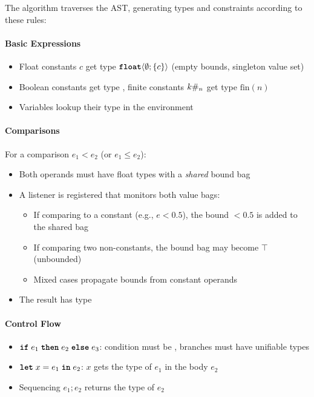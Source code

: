 The algorithm traverses the AST, generating types and constraints according to these rules:

\paragraph{Basic Expressions}
\begin{itemize}
    \item Float constants $c$ get type $\text{\ttfamily\bfseries float}\langle \emptyset; \{c\} \rangle$ (empty bounds, singleton value set)
    \item Boolean constants get type \bool{}, finite constants $k\#_{n}$ get type $\text{fin}(n)$
    \item Variables lookup their type in the environment
\end{itemize}

\paragraph{Comparisons} For a comparison $e_1 < e_2$ (or $e_1 \leq e_2$):
\begin{itemize}
    \item Both operands must have float types with a \emph{shared} bound bag
    \item A listener is registered that monitors both value bags:
    \begin{itemize}
        \item If comparing to a constant (e.g., $e < 0.5$), the bound $<0.5$ is added to the shared bag
        \item If comparing two non-constants, the bound bag may become $\top$ (unbounded)
        \item Mixed cases propagate bounds from constant operands
    \end{itemize}
    \item The result has type \bool{}
\end{itemize}

\paragraph{Control Flow}
\begin{itemize}
    \item $\text{\ttfamily\bfseries if} \; e_1\; \text{\ttfamily\bfseries then} \; e_2\; \text{\ttfamily\bfseries else} \; e_3$: condition must be \bool{}, branches must have unifiable types
    \item $\text{\ttfamily\bfseries let} \; x = e_1 \; \text{\ttfamily\bfseries in} \; e_2$: $x$ gets the type of $e_1$ in the body $e_2$
    \item Sequencing $e_1; e_2$ returns the type of $e_2$
\end{itemize}

